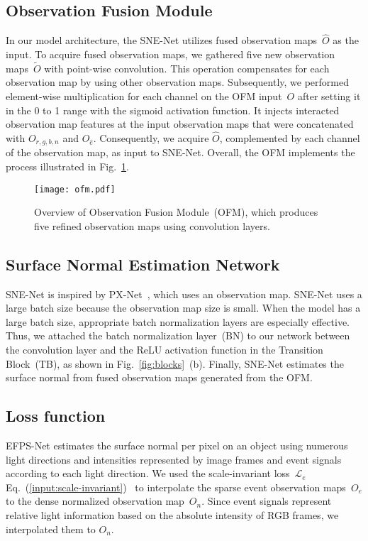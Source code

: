 \documentclass[preprint,12pt,authoryear]{elsarticle}
\begin{document}
\subsection{Observation Fusion Module}
In our model architecture, the SNE-Net utilizes fused observation maps~$\hat{O}$ as the input.
To acquire fused observation maps, we gathered five new observation maps~$\tilde{O}$ with point-wise convolution.
This operation compensates for each observation map by using other observation maps.
Subsequently, we performed element-wise multiplication for each channel on the OFM input~$O$ after setting it in the 0 to 1 range with the sigmoid activation function.
It injects interacted observation map features at the input observation maps that were concatenated with $O_{r,g,b,n}$ and $O_{\hat{e}}$.
Consequently, we acquire $\hat{O}$, complemented by each channel of the observation map, as input to SNE-Net.
Overall, the OFM implements the process illustrated in Fig.~\ref{fig:ofm}.

\begin{figure}[t]
    \centering
    \texttt{[image: ofm.pdf]}
    \caption{Overview of Observation Fusion Module~(OFM), which produces five refined observation maps using convolution layers.}
    \label{fig:ofm}
\end{figure}

\subsection{Surface Normal Estimation Network}
SNE-Net is inspired by PX-Net~\citep{logothetis2021px}, which uses an observation map. SNE-Net uses a large batch size because the observation map size is small. When the model has a large batch size, appropriate batch normalization layers are especially effective. Thus, we attached the batch normalization layer~(BN) to our network between the convolution layer and the ReLU activation function in the Transition Block~(TB), as shown in Fig.~\ref{fig:blocks}~(b). 
Finally, SNE-Net estimates the surface normal from fused observation maps generated from the OFM.

\subsection{Loss function}
EFPS-Net estimates the surface normal per pixel on an object using numerous light directions and intensities represented by image frames and event signals according to each light direction. We used the scale-invariant loss~$\mathcal{L}_{e}$ Eq.~(\ref{input:scale-invariant})~\citep{eigen2014depth} to interpolate the sparse event observation maps~$O_{e}$ to the dense normalized observation map~$O_{n}$. Since event signals represent relative light information based on the absolute intensity of RGB frames, we interpolated them to $O_{n}$.
\end{document}
